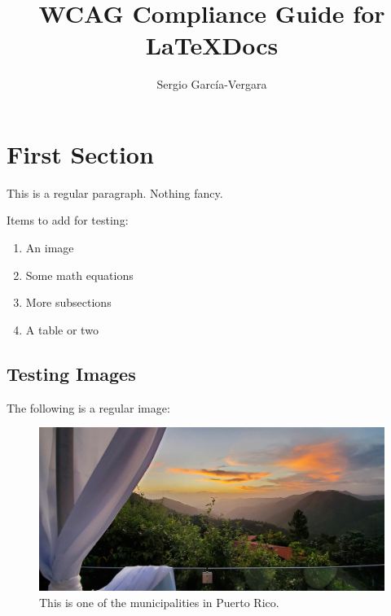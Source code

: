 \documentclass{llncs}
\begin{document}
\title{WCAG Compliance Guide for \LaTeX Docs }

\author{Sergio Garc\'{i}a-Vergara}


\maketitle



\section{First Section}

This is a regular paragraph. Nothing fancy.

Items to add for testing:

\begin{enumerate}
  \item An image
  \item Some math equations
  \item More subsections
  \item A table or two
\end{enumerate}


\subsection{Testing Images}

The following is a regular image:

\begin{figure}[h]
\begin{center}
  \includegraphics[scale=1]{figs/Cayey.jpeg}
\end{center}
  \caption{This is one of the municipalities in Puerto Rico.}
\label{fig:cayey}
\end{figure}


\end{document}
